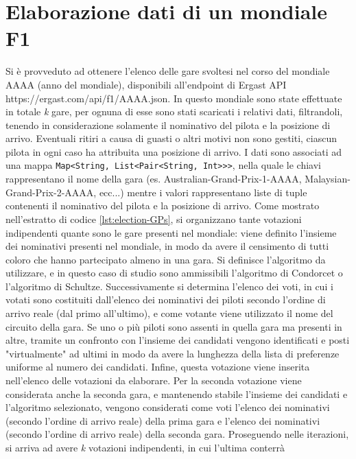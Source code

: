 \documentclass[12pt,a4paper,openright,twoside]{book}
\begin{document}
\section{Elaborazione dati di un mondiale F1}
\label{paragrafoelaborazionemondiale}
Si è provveduto ad ottenere l'elenco delle gare svoltesi nel corso del mondiale AAAA (anno del mondiale), disponibili
all'endpoint di Ergast API \newline https://ergast.com/api/f1/AAAA.json.
In questo mondiale sono state effettuate in totale \textit{k} gare, per ognuna di esse sono stati scaricati i relativi
dati, filtrandoli, tenendo in considerazione solamente il nominativo del pilota e la posizione di arrivo.
Eventuali ritiri a causa di guasti o altri motivi non sono gestiti, ciascun pilota in ogni caso ha attribuita una posizione di arrivo.
I dati sono associati ad una mappa \texttt{Map<String, List<Pair<String, Int>>>}, nella quale le chiavi rappresentano
il nome della gara (es. Australian-Grand-Prix-1-AAAA, Malaysian-Grand-Prix-2-AAAA, ecc...) mentre i valori rappresentano liste
di tuple contenenti il nominativo del pilota e la posizione di arrivo.
Come mostrato nell'estratto di codice \ref{lst:election-GPs}, si organizzano tante votazioni indipendenti quante sono le
gare presenti nel mondiale:
viene definito l'insieme dei nominativi presenti nel mondiale, in modo da
avere il censimento di tutti coloro che hanno partecipato almeno in una gara.
 Si definisce l'algoritmo da utilizzare, e in questo caso di studio sono
ammissibili l'algoritmo di Condorcet o l'algoritmo di Schultze. 
Successivamente si determina l'elenco dei voti, in cui i votati
sono costituiti dall'elenco dei nominativi dei piloti secondo l'ordine di arrivo reale (dal primo all'ultimo), e come votante viene utilizzato il nome del circuito
della gara. Se uno o più piloti sono assenti in quella gara ma presenti in altre, tramite un confronto con l'insieme dei candidati
vengono identificati e posti "virtualmente" ad ultimi in modo da avere la lunghezza della lista 
di preferenze uniforme al numero dei candidati.
Infine, questa votazione viene inserita nell'elenco delle votazioni da elaborare.
Per la seconda votazione viene considerata anche la seconda gara, e mantenendo stabile l'insieme dei candidati e l'algoritmo selezionato,
vengono considerati come voti l'elenco dei nominativi (secondo l'ordine di arrivo reale) della prima gara
e l'elenco dei nominativi (secondo l'ordine di arrivo reale) della seconda gara.
Proseguendo nelle iterazioni, si arriva ad avere \textit{k} votazioni indipendenti, in cui l'ultima conterrà
\end{document}
